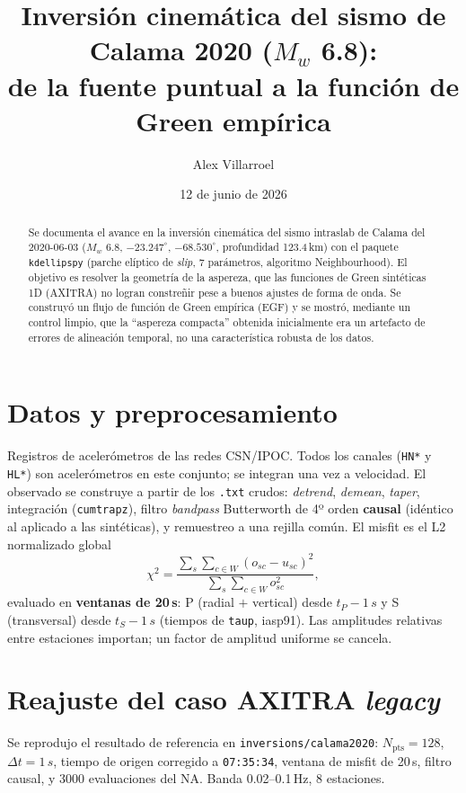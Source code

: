 \documentclass[11pt,a4paper]{article}
\title{Inversión cinemática del sismo de Calama 2020 ($M_w$ 6.8):\\
de la fuente puntual a la función de Green empírica}
\author{Alex Villarroel}
\date{12 de junio de 2026}
\newcommand{\km}{km}
\newcommand{\s}{s}
\newcommand{\Hz}{Hz}
\newcommand{\num}[1]{#1}
\newcommand{\SI}[2]{#1\,#2}
\newcommand{\SIrange}[3]{#1--#2\,#3}
\newcommand{\fn}[1]{\texttt{\small #1}}
\begin{document}
\maketitle

\begin{abstract}
Se documenta el avance en la inversión cinemática del sismo intraslab de Calama
del 2020-06-03 ($M_w$ 6.8, $-23.247^\circ$, $-68.530^\circ$, profundidad
\SI{123.4}{\km}) con el paquete \fn{kdellipspy} (parche elíptico de
\emph{slip}, 7 parámetros, algoritmo Neighbourhood). El objetivo es resolver la
geometría de la aspereza, que las funciones de Green sintéticas 1D (AXITRA) no
logran constreñir pese a buenos ajustes de forma de onda. Se construyó un flujo
de función de Green empírica (EGF) y se mostró, mediante un control limpio, que
la ``aspereza compacta'' obtenida inicialmente era un artefacto de errores de
alineación temporal, no una característica robusta de los datos.
\end{abstract}

\section{Datos y preprocesamiento}
Registros de acelerómetros de las redes CSN/IPOC. Todos los canales (\fn{HN*} y
\fn{HL*}) son acelerómetros en este conjunto; se integran una vez a velocidad.
El observado se construye a partir de los \fn{.txt} crudos: \emph{detrend},
\emph{demean}, \emph{taper}, integración (\fn{cumtrapz}), filtro
\emph{bandpass} Butterworth de 4º orden \textbf{causal} (idéntico al aplicado a
las sintéticas), y remuestreo a una rejilla común. El misfit es el L2
normalizado global
\begin{equation}
  \chi^2 = \frac{\sum_{s}\sum_{c\in W}(o_{sc}-u_{sc})^2}
                {\sum_{s}\sum_{c\in W} o_{sc}^2},
\end{equation}
evaluado en \textbf{ventanas de \SI{20}{\s}}: P (radial $+$ vertical) desde
$t_P-\SI{1}{\s}$ y S (transversal) desde $t_S-\SI{1}{\s}$ (tiempos de
\texttt{taup}, iasp91). Las amplitudes relativas entre estaciones importan; un
factor de amplitud uniforme se cancela.

\section{Reajuste del caso AXITRA \emph{legacy}}
Se reprodujo el resultado de referencia en \fn{inversions/calama2020}:
$N_\text{pts}=128$, $\Delta t=\SI{1}{\s}$, tiempo de origen corregido a
\texttt{07:35:34}, ventana de misfit de \SI{20}{\s}, filtro causal, y
\num{3000} evaluaciones del NA. Banda \SIrange{0.02}{0.1}{\Hz}, 8 estaciones.
\end{document}
